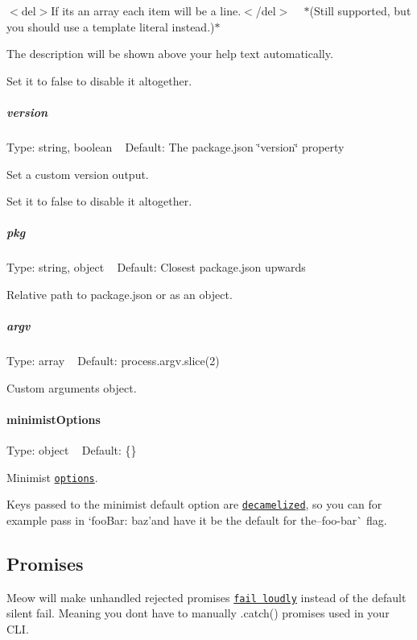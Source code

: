 $<$del$>$If it\textquotesingle{}s an array each item will be a line.$<$/del$>$ ~\newline
$\ast$(Still supported, but you should use a template literal instead.)$\ast$

The description will be shown above your help text automatically.

Set it to {\ttfamily false} to disable it altogether.

\subparagraph*{version}

Type\+: {\ttfamily string}, {\ttfamily boolean} ~\newline
Default\+: The package.\+json {\ttfamily \char`\"{}version\char`\"{}} property

Set a custom version output.

Set it to {\ttfamily false} to disable it altogether.

\subparagraph*{pkg}

Type\+: {\ttfamily string}, {\ttfamily object} ~\newline
Default\+: Closest package.\+json upwards

Relative path to package.\+json or as an object.

\subparagraph*{argv}

Type\+: {\ttfamily array} ~\newline
Default\+: {\ttfamily process.\+argv.\+slice(2)}

Custom arguments object.

\paragraph*{minimist\+Options}

Type\+: {\ttfamily object} ~\newline
Default\+: {\ttfamily \{\}}

Minimist \href{https://github.com/substack/minimist#var-argv--parseargsargs-opts}{\tt options}.

Keys passed to the minimist {\ttfamily default} option are \href{https://github.com/sindresorhus/decamelize}{\tt decamelized}, so you can for example pass in `foo\+Bar\+: \textquotesingle{}baz'{\ttfamily and have it be the default for the}--foo-\/bar\`{} flag.

\subsection*{Promises}

Meow will make unhandled rejected promises \href{https://github.com/sindresorhus/loud-rejection}{\tt fail loudly} instead of the default silent fail. Meaning you don\textquotesingle{}t have to manually {\ttfamily .catch()} promises used in your C\+LI.

